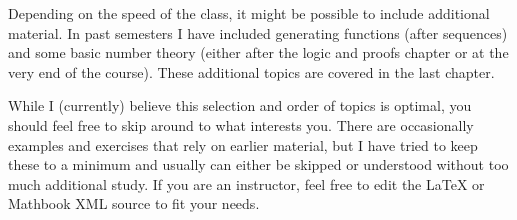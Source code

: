 \documentclass[10pt,]{book}
\theoremstyle{plain}
\theoremstyle{definition}
\theoremstyle{definition}
\numberwithin{equation}{chapter}
\begin{document}
\par
\hypertarget{p-10}{}%
Depending on the speed of the class, it might be possible to include additional material. In past semesters I have included generating functions (after sequences) and some basic number theory (either after the logic and proofs chapter or at the very end of the course). These additional topics are covered in the last chapter.%
\par
\hypertarget{p-11}{}%
While I (currently) believe this selection and order of topics is optimal, you should feel free to skip around to what interests you. There are occasionally examples and exercises that rely on earlier material, but I have tried to keep these to a minimum and usually can either be skipped or understood without too much additional study. If you are an instructor, feel free to edit the \LaTeX{} or Mathbook XML source to fit your needs.%
\typeout{************************************************}
\typeout{************************************************}
\end{document}
